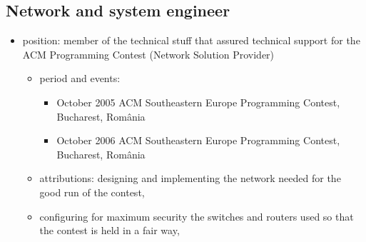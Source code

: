 \documentclass[a4paper,12pt,openany]{article}
\begin{document}
	\subsection{Network and system engineer}
		\begin{itemize}
 			\item position: member of the technical stuff that assured technical support for the ACM Programming Contest (Network Solution Provider)
			\begin{itemize}
		 		
				\item period and events: 
				\begin{itemize}
					\item October 2005 ACM Southeastern Europe Programming Contest, Bucharest, România
					\item October 2006 ACM Southeastern Europe Programming Contest, Bucharest, România
				\end{itemize}
				\item attributions: designing and implementing the network needed for the good run of the contest, 
				\item configuring for maximum security the switches and routers used so that the contest is held in a fair way,


\end{itemize}
\end{itemize}
\end{document}
